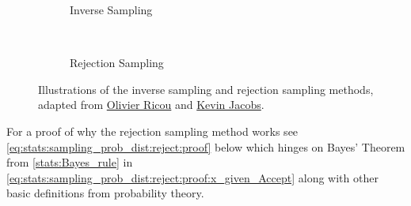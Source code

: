 \begin{figure}[H]
  \begin{subfigure}[b]{0.48\textwidth}\centering
    \usebox{\largestimage}
    \vspace{0.01cm}
  \caption{Inverse Sampling}
  \label{fig:stats:sampling_prob_dist:inverse}
  \end{subfigure}
  ~
  \begin{subfigure}[b]{\wd\largestimage}\centering
  \caption{Rejection Sampling}
  \label{fig:stats:sampling_prob_dist:reject}
  \end{subfigure}
\caption{
Illustrations of the inverse sampling and rejection sampling methods, adapted from \href{https://en.wikipedia.org/wiki/File:Inverse_transform_sampling.png}{Olivier Ricou} and \href{https://www.data-blogger.com/2016/01/24/the-mathematics-behind-rejection-sampling/}{Kevin Jacobs}.
  \label{fig:stats:sampling_prob_distr}
}
\end{figure}

For a proof of why the rejection sampling method works see \cref{eq:stats:sampling_prob_dist:reject:proof} below
which hinges on Bayes' Theorem from \cref{stats:Bayes_rule} in \cref{eq:stats:sampling_prob_dist:reject:proof:x_given_Accept}
along with other basic definitions from probability theory.

